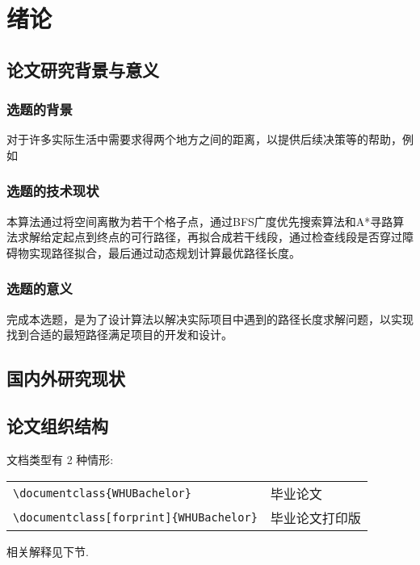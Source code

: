 \chapter{绪论}
 
 \section{论文研究背景与意义}
\subsection{选题的背景}
对于许多实际生活中需要求得两个地方之间的距离，以提供后续决策等的帮助，例如
\subsection{选题的技术现状}
本算法通过将空间离散为若干个格子点，通过BFS广度优先搜索算法和A*寻路算法求解给定起点到终点的可行路径，再拟合成若干线段，通过检查线段是否穿过障碍物实现路径拟合，最后通过动态规划计算最优路径长度。
\subsection{选题的意义}
完成本选题，是为了设计算法以解决实际项目中遇到的路径长度求解问题，以实现找到合适的最短路径满足项目的开发和设计。

\section{国内外研究现状}


\section{论文组织结构}
文档类型有 2 种情形:

\begin{table}[ht]\centering
\begin{tabular}{ll}
\hline
   \verb|\documentclass{WHUBachelor}|                     &  毕业论文 \\
   \verb|\documentclass[forprint]{WHUBachelor}|        &  毕业论文打印版 \\
\hline
\end{tabular}
\end{table}
相关解释见下节.